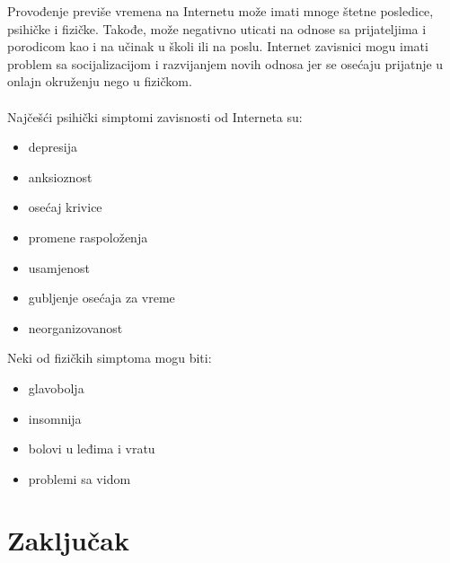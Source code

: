 \documentclass[a4paper]{article}
\begin{document}
Provođenje previše vremena na Internetu može imati mnoge štetne posledice, psihičke i fizičke. Takođe, može negativno uticati na odnose sa prijateljima i porodicom kao i na učinak u školi ili na poslu.
Internet zavisnici mogu imati problem sa socijalizacijom i razvijanjem novih odnosa jer se osećaju prijatnje u onlajn okruženju nego u fizičkom.\\\\ Najčešći psihički simptomi zavisnosti od Interneta su:
\begin{multicols}{2}
\begin{itemize}
    \item depresija
    \item anksioznost
    \item osećaj krivice
    \item promene raspoloženja
    \item usamjenost
    \item gubljenje osećaja za vreme
    \item neorganizovanost
\end{itemize}
\end{multicols}


Neki od fizičkih simptoma mogu biti:
\begin{multicols}{2}
\begin{itemize}
    \item glavobolja
    \item insomnija
    \item bolovi u leđima i vratu
    \item problemi sa vidom
\end{itemize}
\end{multicols}


\section{Zaključak}
\label{sec:zakljucak}

\appendix
 

\appendix
\end{document}
